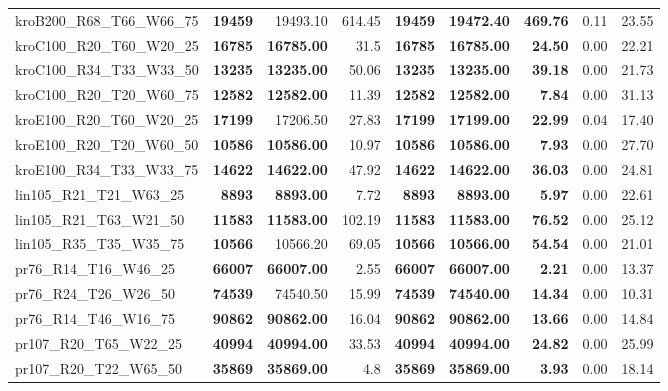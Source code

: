 \documentclass{singlecol-new}
\begin{document}
{\begin{longtable}{lrrrrrrrr}
		kroB200\_R68\_T66\_W66\_75 & \textbf{19459} & 19493.10 & 614.45 & \textbf{19459} & \textbf{19472.40} & \textbf{469.76} & 0.11 & 23.55 \\
		kroC100\_R20\_T60\_W20\_25 & \textbf{16785} & \textbf{16785.00} & 31.5 & \textbf{16785} & \textbf{16785.00} & \textbf{24.50} & 0.00 & 22.21 \\
		kroC100\_R34\_T33\_W33\_50 & \textbf{13235} & \textbf{13235.00} & 50.06 & \textbf{13235} & \textbf{13235.00} & \textbf{39.18} & 0.00 & 21.73 \\
		kroC100\_R20\_T20\_W60\_75 & \textbf{12582} & \textbf{12582.00} & 11.39 & \textbf{12582} & \textbf{12582.00} & \textbf{7.84} & 0.00 & 31.13 \\
		kroE100\_R20\_T60\_W20\_25 & \textbf{17199} & 17206.50 & 27.83 & \textbf{17199} & \textbf{17199.00} & \textbf{22.99} & 0.04 & 17.40 \\
		kroE100\_R20\_T20\_W60\_50 & \textbf{10586} & \textbf{10586.00} & 10.97 & \textbf{10586} & \textbf{10586.00} & \textbf{7.93} & 0.00 & 27.70 \\
		kroE100\_R34\_T33\_W33\_75 & \textbf{14622} & \textbf{14622.00} & 47.92 & \textbf{14622} & \textbf{14622.00} & \textbf{36.03} & 0.00 & 24.81 \\
		lin105\_R21\_T21\_W63\_25 & \textbf{8893} & \textbf{8893.00} & 7.72 & \textbf{8893} & \textbf{8893.00} & \textbf{5.97} & 0.00 & 22.61 \\
		lin105\_R21\_T63\_W21\_50 & \textbf{11583} & \textbf{11583.00} & 102.19 & \textbf{11583} & \textbf{11583.00} & \textbf{76.52} & 0.00 & 25.12 \\
		lin105\_R35\_T35\_W35\_75 & \textbf{10566} & 10566.20 & 69.05 & \textbf{10566} & \textbf{10566.00} & \textbf{54.54} & 0.00 & 21.01 \\
		pr76\_R14\_T16\_W46\_25 & \textbf{66007} & \textbf{66007.00} & 2.55 & \textbf{66007} & \textbf{66007.00} & \textbf{2.21} & 0.00 & 13.37 \\
		pr76\_R24\_T26\_W26\_50 & \textbf{74539} & 74540.50 & 15.99 & \textbf{74539} & \textbf{74540.00} & \textbf{14.34} & 0.00 & 10.31 \\
		pr76\_R14\_T46\_W16\_75 & \textbf{90862} & \textbf{90862.00} & 16.04 & \textbf{90862} & \textbf{90862.00} & \textbf{13.66} & 0.00 & 14.84 \\
		pr107\_R20\_T65\_W22\_25 & \textbf{40994} & \textbf{40994.00} & 33.53 & \textbf{40994} & \textbf{40994.00} & \textbf{24.82} & 0.00 & 25.99 \\
		pr107\_R20\_T22\_W65\_50 & \textbf{35869} & \textbf{35869.00} & 4.8 & \textbf{35869} & \textbf{35869.00} & \textbf{3.93} & 0.00 & 18.14 \\

\end{longtable}}
\end{document}
